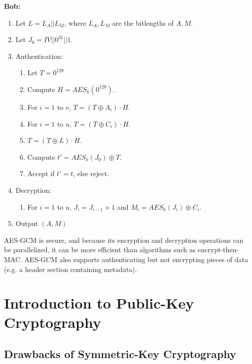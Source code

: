 \documentclass[12pt,titlepage]{article}
\let\stdsection\section
\renewcommand\section{\clearpage\stdsection}
\begin{document}
        \textbf{Bob:}
        \begin{enumerate}
          \item Let $L = L_A || L_M$, where $L_A, L_M$ are the bitlengths of $A, M$.
          \item Let $J_0 = IV || 0^{31} || 1$.
          \item Authentication:
            \begin{enumerate}
              \item Let $T = 0^{128}$
              \item Compute $H = AES_k(0^{128})$.
              \item For $i = 1$ to $v$, $T = (T \oplus A_i) \cdot H$.
              \item For $i = 1$ to $u$, $T = (T \oplus C_i) \cdot H$.
              \item $T = (T \oplus L) \cdot H$.
              \item Compute $t' = AES_k(J_0) \oplus T$.
              \item Accept if $t' = t$, else reject.
            \end{enumerate}
          \item Decryption:
            \begin{enumerate}
              \item For $i = 1$ to $u$, $J_{i} = J_{i-1} + 1$ and $M_i = AES_{k}(J_i) \oplus C_i$.
            \end{enumerate}
          \item Output $(A, M)$
        \end{enumerate}

        AES-GCM is secure, and because its encryption and decryption operations can be parallelized, it can be more efficient than algorithms such as encrypt-then-MAC. AES-GCM also
        supports authenticating but not encrypting pieces of data (e.g. a header section containing metadata).

  \section{Introduction to Public-Key Cryptography}

    \subsection{Drawbacks of Symmetric-Key Cryptography}
\end{document}

